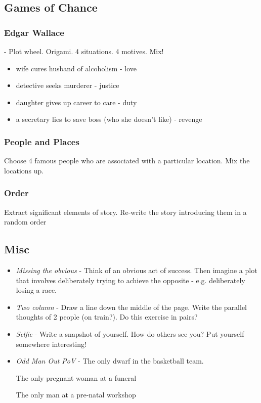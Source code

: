\documentclass[11pt]{article}
\begin{document}
\subsection*{Games of Chance}


\subsubsection*{Edgar Wallace} - Plot wheel. Origami. 4 situations. 4 motives. Mix!
\begin{itemize}
\item wife cures husband of alcoholism - love
\item detective seeks murderer - justice
\item daughter gives up career to care - duty
\item a secretary lies to save boss (who she doesn't like) - revenge
\end{itemize}

\subsubsection*{People and Places}
Choose 4 famous people who are associated with a particular location. Mix the locations up.

\subsubsection*{Order}
Extract significant elements of story. Re-write the story introducing them in a random order

\subsection*{Misc}
\begin{itemize}

\item \textit{Missing the obvious} -
Think of an obvious act of success. Then imagine a plot that involves deliberately trying to achieve the opposite - e.g. deliberately losing a race. 

\item \textit{Two column} -
Draw a line down the middle of the page. Write the parallel thoughts of 2 people (on train?). Do this exercise in pairs?

\item \textit{Selfie} -
Write a snapshot of yourself. How do others see you?  Put yourself somewhere interesting!

\item \textit{Odd Man Out PoV} -
The only dwarf in the basketball team. 

The only pregnant woman at a funeral

The only man at a pre-natal workshop
\end{itemize}
\end{document}
